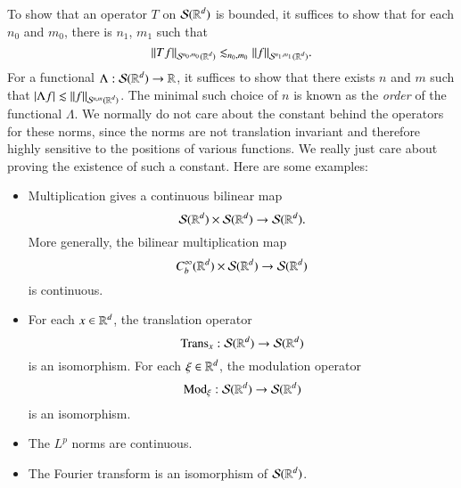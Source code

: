 To show that an operator $T$ on $\mathcal{S}(\operatorname{\mathbb{R}}^d)$ is bounded, it suffices to show that for each $n_0$ and $m_0$, there is $n_1$, $m_1$ such that
%
\[ \| Tf \|_{\mathcal{S}^{n_0,m_0}(\operatorname{\mathbb{R}}^d)} \lesssim_{n_0,m_0} \| f \|_{\mathcal{S}^{n_1,m_1}(\operatorname{\mathbb{R}}^d)}. \]
%
For a functional $\Lambda: \mathcal{S}(\operatorname{\mathbb{R}}^d) \to \operatorname{\mathbb{R}}$, it suffices to show that there exists $n$ and $m$ such that $|\Lambda f| \lesssim \| f \|_{\mathcal{S}^{n,m}(\operatorname{\mathbb{R}}^d)}$. The minimal such choice of $n$ is known as the \emph{order} of the functional $\Lambda$. We normally do not care about the constant behind the operators for these norms, since the norms are not translation invariant and therefore highly sensitive to the positions of various functions. We really just care about proving the existence of such a constant.
%
Here are some examples:
%
\begin{itemize}
    \item Multiplication gives a continuous bilinear map
    \[ \operatorname{\mathcal{S}}(\operatorname{\mathbb{R}}^d) \times \operatorname{\mathcal{S}}(\operatorname{\mathbb{R}}^d) \to \operatorname{\mathcal{S}}(\operatorname{\mathbb{R}}^d). \]
    More generally, the bilinear multiplication map
    \[ C^\infty_b(\operatorname{\mathbb{R}}^d) \times \operatorname{\mathcal{S}}(\operatorname{\mathbb{R}}^d) \to \operatorname{\mathcal{S}}(\operatorname{\mathbb{R}}^d) \]
    is continuous.

    \item For each $x \in \operatorname{\mathbb{R}}^d$, the translation operator
    \[ \text{Trans}_x: \operatorname{\mathcal{S}}(\operatorname{\mathbb{R}}^d) \to \operatorname{\mathcal{S}}(\operatorname{\mathbb{R}}^d) \]
    is an isomorphism. For each $\xi \in \operatorname{\mathbb{R}}^d$, the modulation operator
    \[ \text{Mod}_\xi: \operatorname{\mathcal{S}}(\operatorname{\mathbb{R}}^d) \to \operatorname{\mathcal{S}}(\operatorname{\mathbb{R}}^d) \]
    is an isomorphism.

    \item The $L^p$ norms are continuous.

    \item The Fourier transform is an isomorphism of $\operatorname{\mathcal{S}}(\operatorname{\mathbb{R}}^d)$.
\end{itemize}
